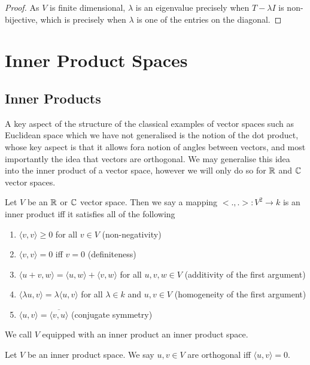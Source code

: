 \documentclass[]{article}
\begin{document}
\begin{proof}
		As $V$ is finite dimensional, $\lambda$ is an eigenvalue precisely when $T - \lambda I$ is non-bijective, which is precisely when $\lambda$ is one of the entries on the diagonal.
\end{proof}

\section{Inner Product Spaces}
		
\subsection{Inner Products}

A key aspect of the structure of the classical examples of vector spaces such as Euclidean space which we have not generalised is the notion of the dot product, whose key aspect is that it allows fora notion of angles between vectors, and most importantly the idea that vectors are orthogonal. We may generalise this idea into the inner product of a vector space, however we will only do so for $\mathbb{R}$ and $\mathbb{C}$ vector spaces.

\begin{defi} 
	Let $V$ be an $\mathbb{R}$ or $\mathbb{C}$ vector space. Then we say a mapping $<.,.>: V^2 \to k$ is an inner product iff it satisfies all of the following
	\begin{enumerate}
			\item $\langle v, v \rangle \geq 0$ for all $v \in V$ (non-negativity)
			\item $\langle v, v \rangle = 0$ iff $v = 0$ (definiteness)
			\item $\langle u+v, w \rangle = \langle u, w \rangle + \langle v, w \rangle $ for all $u,v,w \in V$ (additivity of the first argument)
			\item $\langle \lambda u, v \rangle = \lambda \langle u, v \rangle $ for all $\lambda \in k$ and $u,v \in V$ (homogeneity of the first argument)
			\item $\langle u, v \rangle = \overline{\langle v, u \rangle }$ (conjugate symmetry)
	\end{enumerate}

	We call $V$ equipped with an inner product an inner product space.
\end{defi}

\begin{defi} [Orthogonality]
	Let $V$ be an inner product space. We say $u,v \in V$ are orthogonal iff $\langle u, v \rangle = 0$.
\end{defi}
\end{document}
